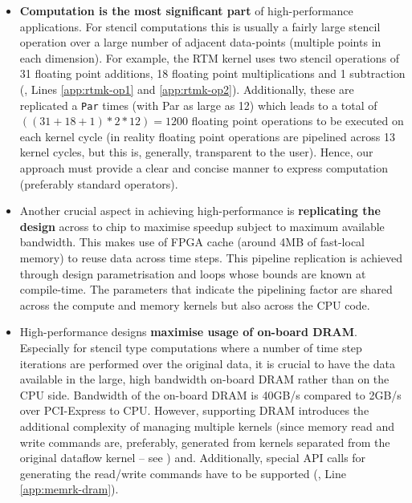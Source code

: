 \begin{itemize}

\item \textbf{Computation is the most significant part} of
  high-performance applications. For stencil computations this is
  usually a fairly large stencil operation over a large number of
  adjacent data-points (multiple points in each dimension). For
  example, the RTM kernel uses two stencil operations of 31 floating
  point additions, 18 floating point multiplications and 1
  subtraction (, Lines \ref{app:rtmk-op1} and
  \ref{app:rtmk-op2}).  Additionally, these are replicated a
  \texttt{Par} times (with Par as large as 12) which leads to a total
  of $((31 + 18 + 1) * 2 * 12) = 1200 $ floating point operations to
  be executed on each kernel cycle (in reality floating point
  operations are pipelined across 13 kernel cycles, but this is,
  generally, transparent to the user). Hence, our approach must
  provide a clear and concise manner to express computation
  (preferably standard operators).

\item Another crucial aspect in achieving high-performance is
  \textbf{replicating the design} across to chip to maximise speedup subject to
  maximum available bandwidth. This makes use of FPGA cache (around
  4MB of fast-local memory) to reuse data across time steps. This
  pipeline replication is achieved through design parametrisation and
  loops whose bounds are known at compile-time. The parameters that
  indicate the pipelining factor are shared across the compute and
  memory kernels but also across the CPU code.

\item High-performance designs \textbf{maximise usage of on-board
    DRAM}. Especially for stencil type computations where a number of
  time step iterations are performed over the original data, it is
  crucial to have the data available in the large, high bandwidth
  on-board DRAM rather than on the CPU side. Bandwidth of the on-board
  DRAM is 40GB/s compared to 2GB/s over PCI-Express to CPU. However,
  supporting DRAM introduces the additional complexity of managing
  multiple kernels (since memory read and write commands are,
  preferably, generated from kernels separated from the original
  dataflow kernel -- see )
  and. Additionally, special API calls for generating the read/write
  commands have to be supported (, Line
  \ref{app:memrk-dram}).


\end{itemize}
